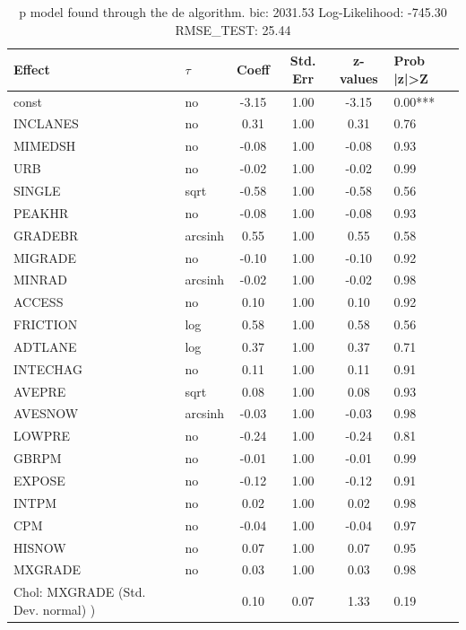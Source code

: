 \begin{table}
	\caption{p model found through the de algorithm. bic: 2031.53 Log-Likelihood: -745.30 RMSE_TEST: 25.44}
	\begin{center}
		\begin{tabular}{|l|l|c|c|c|l|}
			\hline
			Effect & $\tau$ & Coeff & Std. Err & z-values & Prob |z|>Z \\
			\hline
			const & no & -3.15 & 1.00 & -3.15 & 0.00*** \\
			\hline
			INCLANES & no & 0.31 & 1.00 & 0.31 & 0.76 \\
			\hline
			MIMEDSH & no & -0.08 & 1.00 & -0.08 & 0.93 \\
			\hline
			URB & no & -0.02 & 1.00 & -0.02 & 0.99 \\
			\hline
			SINGLE & sqrt & -0.58 & 1.00 & -0.58 & 0.56 \\
			\hline
			PEAKHR & no & -0.08 & 1.00 & -0.08 & 0.93 \\
			\hline
			GRADEBR & arcsinh & 0.55 & 1.00 & 0.55 & 0.58 \\
			\hline
			MIGRADE & no & -0.10 & 1.00 & -0.10 & 0.92 \\
			\hline
			MINRAD & arcsinh & -0.02 & 1.00 & -0.02 & 0.98 \\
			\hline
			ACCESS & no & 0.10 & 1.00 & 0.10 & 0.92 \\
			\hline
			FRICTION & log & 0.58 & 1.00 & 0.58 & 0.56 \\
			\hline
			ADTLANE & log & 0.37 & 1.00 & 0.37 & 0.71 \\
			\hline
			INTECHAG & no & 0.11 & 1.00 & 0.11 & 0.91 \\
			\hline
			AVEPRE & sqrt & 0.08 & 1.00 & 0.08 & 0.93 \\
			\hline
			AVESNOW & arcsinh & -0.03 & 1.00 & -0.03 & 0.98 \\
			\hline
			LOWPRE & no & -0.24 & 1.00 & -0.24 & 0.81 \\
			\hline
			GBRPM & no & -0.01 & 1.00 & -0.01 & 0.99 \\
			\hline
			EXPOSE & no & -0.12 & 1.00 & -0.12 & 0.91 \\
			\hline
			INTPM & no & 0.02 & 1.00 & 0.02 & 0.98 \\
			\hline
			CPM & no & -0.04 & 1.00 & -0.04 & 0.97 \\
			\hline
			HISNOW & no & 0.07 & 1.00 & 0.07 & 0.95 \\
			\hline
			MXGRADE & no & 0.03 & 1.00 & 0.03 & 0.98 \\
			\hline
			 Chol: MXGRADE (Std. Dev. normal) ) &  & 0.10 & 0.07 & 1.33 & 0.19 \\
			\hline
		\end{tabular}
	\end{center}
\end{table}